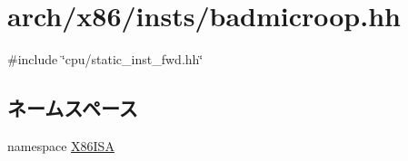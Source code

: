 \hypertarget{badmicroop_8hh}{
\section{arch/x86/insts/badmicroop.hh}
\label{badmicroop_8hh}
}
{\ttfamily \#include \char`\"{}cpu/static\_\-inst\_\-fwd.hh\char`\"{}}\par
\subsection*{ネームスペース}
\begin{DoxyCompactItemize}
\item 
namespace \hyperlink{namespaceX86ISA}{X86ISA}
\end{DoxyCompactItemize}
